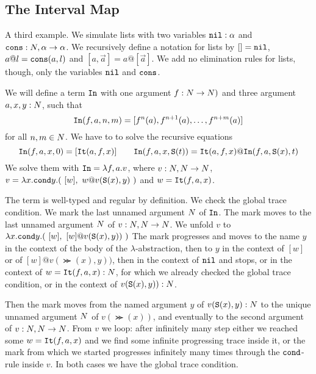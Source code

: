 \documentclass{article}
\begin{document}
\subsection{The Interval Map}
A third example. We simulate lists with two variables ${\tt nil}:\alpha$ and 
${\tt cons}:{N},\alpha \rightarrow \alpha$. We recursively define a notation for lists by $[]={\tt nil}$,
$a @ l={\tt cons}(a,l)$ and $[a,\vec{a}] = a @ [\vec{a}]$. We add no elimination rules for lists, though,
only the variables ${\tt nil}$ and ${\tt cons}$.

We will define a term ${\tt In}$ with one argument $f:{N} \rightarrow {N})$ and three argument
$a,x,y:{N}$, such that 
$$
{\tt In}(f,a,n,m) = [f^n(a), f^{n+1}(a), \ldots, f^{n+m}(a)]
$$ 
for all $n,m \in {N}$. 
We have to to solve the recursive equations 
$$
\Interval(f,a,x,0) = [\Iter(a,f,x)]
\ \ \ \ \ \ 
\Interval(f,a,x,\Succ (t)) = \Iter(a,f,x) @ \Interval(f,a,\Succ(x),t)
$$ 
We solve them with ${\tt In} = \lambda f,a.v$,
where $v:{N},{N}\rightarrow {N}$, 
$v = \lambda x.{\tt cond} y. (\ [w],  \  w @ v({\tt S} (x),y) \ )$ and $w={\tt It}(f,a,x)$.

The term is well-typed and regular by definition. We check the global trace condition.
We mark the last unnamed argument ${N}$ of ${\tt In}$.
The mark moves to the last unnamed argument ${N}$ of  
$v:{N},{N} \rightarrow {N}$. 
We unfold $v$ to $\lambda x.{\tt cond} y. 
(\ [w],  \  [w] @ v({\tt S} (x),y)) \ )$
The mark progresses and moves to the name $y$ in the context of the body of the $\lambda$-abstraction,
then to $y$ in the context of $[w]$ or of $ [w] @ v(\Succ (x),y))$,
then in the context of ${\tt nil}$ and stops, or in the context of $w={\tt It}(f,a,x):{N}$, 
for which we already checked the global trace condition, or in the context of $v({\tt S} (x),y)):{N}$. 

Then the mark moves from the named argument $y$ of $v({\tt S} (x),y):{N}$ to the unique 
unnamed argument ${N}$ of $v(\Succ (x))$, 
and eventually to the second argument of $v:{N},{N}\rightarrow {N}$. 
From $v$ we loop: after infinitely many step either we reached some $w={\tt It}(f,a,x)$ 
and we find some infinite progressing trace inside it, or the
mark from which we started progresses infinitely many times through the ${\tt cond}$-rule inside $v$. 
In both cases we have the global trace condition.
\end{document}
